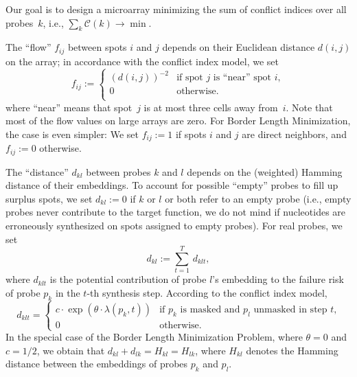 \documentclass[english]{lni}
\begin{document}
Our goal is to design a microarray minimizing the sum of conflict indices over
all probes~$k$, i.e., $\sum_{k} \mathcal{C}(k) \to \min$.

The ``flow'' $f_{ij}$ between spots $i$ and $j$ depends on their Euclidean distance
$d(i,j)$ on the array; in accordance with the conflict index model, we set
\begin{equation}
  f_{ij} := \left\{ \begin{array}{ll}
      (d(i,j))^{-2} & \mbox{if spot $j$ is ``near'' spot $i$}, \\
      0 & \mbox{otherwise}. \\
    \end{array} \right.
\end{equation}
where ``near'' means that spot~$j$ is at most three cells away from~$i$. Note
that most of the flow values on large arrays are zero. For Border Length
Minimization, the case is even simpler: We set $f_{ij}:=1$ if spots $i$ and
$j$ are direct neighbors, and $f_{ij}:=0$ otherwise.

The ``distance'' $d_{kl}$ between probes $k$ and $l$ depends on the (weighted) Hamming
distance of their embeddings. To account for possible ``empty'' probes to fill
up surplus spots, we set $d_{kl}:=0$ if $k$ or $l$ or both refer to an empty
probe (i.e., empty probes never contribute to the target function, we do not
mind if nucleotides are erroneously synthesized on spots assigned to empty
probes). For real probes, we set
\[ d_{kl} := \sum_{t=1}^T\, d_{klt}, \]
where $d_{klt}$ is the
potential contribution of probe $l$'s embedding to the failure risk of probe
$p_k$ in the $t$-th synthesis step. According to the conflict index model,
\[ d_{klt}  = \left\{ \begin{array}{ll}
    c \cdot \exp(\theta \cdot \lambda(p_k,t)) 
    & \mbox{if $p_k$ is masked and $p_l$ unmasked in step $t$,}\\
    0
    & \mbox{otherwise.}
  \end{array} \right.
\]
In the special case of the Border Length Minimization Problem, where
$\theta=0$ and $c=1/2$, we obtain that $d_{kl} + d_{lk} = H_{kl} = H_{lk}$,
where $H_{kl}$ denotes the  Hamming distance between the embeddings of probes
$p_k$ and $p_l$.
\end{document}
